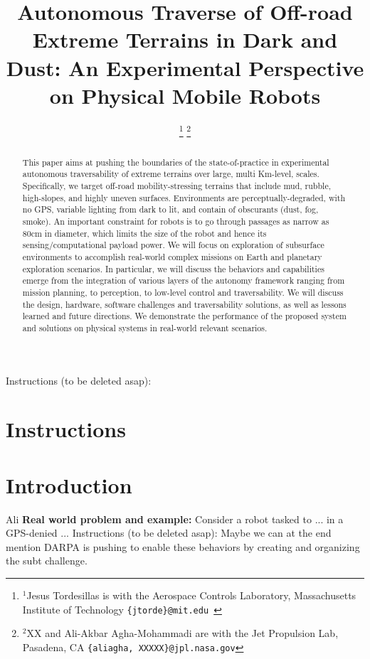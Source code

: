 \documentclass[letterpaper, 10 pt, conference]{ieeeconf}  %
\title{\LARGE \bf
Autonomous Traverse of Off-road Extreme Terrains in Dark and Dust:
An Experimental Perspective on Physical Mobile Robots
}
\author{%
%
\thanks{$^{1}$Jesus Tordesillas is with the Aerospace Controls Laboratory, Massachusetts Institute of Technology \tt\{jtorde\}@mit.edu
       }%
\thanks{$^{2}$XX and Ali-Akbar Agha-Mohammadi are with the Jet Propulsion Lab, Pasadena, CA
        \tt\{aliagha, XXXXX\}@jpl.nasa.gov}%
}
\newcommand{\pr}[1]{\textbf{#1:}}  %
\newcommand{\ph}[1]{\pr{#1}} %
\newcommand{\todo}[1]{{\color{red} #1 }} %
\newcommand{\inst}[1]{{\color{orange} Instructions (to be deleted asap): #1 }} %
\begin{document}
\maketitle
\thispagestyle{empty}
\pagestyle{empty}





\begin{abstract}
This paper aims at pushing the boundaries of the state-of-practice in experimental autonomous traversability of extreme terrains over large, multi Km-level, scales. Specifically, we target off-road mobility-stressing terrains that include mud, rubble, high-slopes, and highly uneven surfaces. Environments are perceptually-degraded, with no GPS, variable lighting from dark to lit, and contain of obscurants (dust, fog, smoke). An important constraint for robots is to go through passages as narrow as 80cm in diameter, which limits the size of the robot and hence its sensing/computational payload power. We will focus on exploration of subsurface environments to accomplish real-world complex  missions on Earth and planetary exploration scenarios. In  particular,  we  will  discuss  the  behaviors  and  capabilities
emerge   from   the   integration   of   various layers of the  autonomy  framework ranging from mission planning, to perception, to low-level control and traversability. We  will  discuss  the  design,
hardware,  software  challenges  and traversability solutions, as well as lessons learned and future directions. We demonstrate the performance
of   the   proposed   system   and   solutions   on   physical   systems
in  real-world  relevant scenarios.
\end{abstract}

\inst{\section{Instructions}}

\section{Introduction}
\todo{Ali} \ph{Real world problem and example} Consider a robot tasked to ... in a GPS-denied ... \inst{Maybe we can at the end mention DARPA is pushing to enable these behaviors by creating and organizing the subt challenge.}
\end{document}
